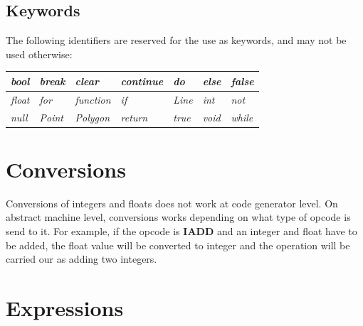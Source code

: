 \documentclass{l3proj}
\begin{document}
\subsection{Keywords}
The following identifiers are reserved for the use as keywords, and may not be used otherwise: 


\begin{center}
    \begin{tabular}{ | l | l | l | l | l |l|l|}
    \hline
    \textit{bool} & \textit{break} & \textit{clear} & \textit{continue}& \textit{do}  &  \textit{else} & \textit{false}\\
    \hline \textit{float} & \textit{for}& \textit{function} &
 
    \textit{if} & \textit{Line} & \textit{int} & \textit{not}\\ 
    \hline
    
    \textit{null} &
    \textit{Point} & \textit{Polygon} & \textit{return} & \textit{true}
     &
    \textit{void} & \textit{while} \\
    \hline

    \end{tabular}
\end{center}

\section{Conversions}
Conversions of integers and floats does not work at code generator level. On abstract machine level, conversions works depending on what type of opcode is send to it. For example, if the opcode is \textbf{IADD} and an integer and float have to be added, the float value will be converted to integer and the operation will be carried our as adding two integers.  
\section{Expressions}
\end{document}
